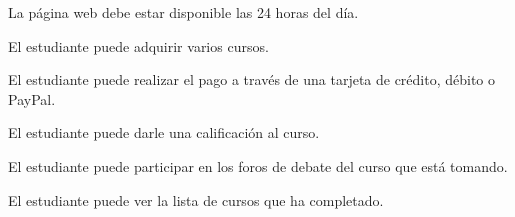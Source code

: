\documentclass[../main.tex]{subfiles}
\begin{document}
\begin{enumeratedtable}[prefix=RN]
  \item{La página web debe estar disponible las 24 horas del día.}
  \item{El estudiante puede adquirir varios cursos.}
  \item{El estudiante puede realizar el pago a través de una tarjeta de crédito, débito o PayPal.}
  \item{El estudiante puede darle una calificación al curso.}
  \item{El estudiante puede participar en los foros de debate del curso que está tomando.}
  \item{El estudiante puede ver la lista de cursos que ha completado.}
\end{enumeratedtable}
\end{document}
